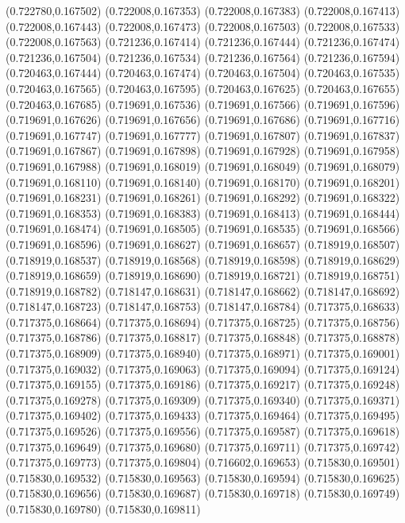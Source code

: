 (0.722780,0.167502)
(0.722008,0.167353)
(0.722008,0.167383)
(0.722008,0.167413)
(0.722008,0.167443)
(0.722008,0.167473)
(0.722008,0.167503)
(0.722008,0.167533)
(0.722008,0.167563)
(0.721236,0.167414)
(0.721236,0.167444)
(0.721236,0.167474)
(0.721236,0.167504)
(0.721236,0.167534)
(0.721236,0.167564)
(0.721236,0.167594)
(0.720463,0.167444)
(0.720463,0.167474)
(0.720463,0.167504)
(0.720463,0.167535)
(0.720463,0.167565)
(0.720463,0.167595)
(0.720463,0.167625)
(0.720463,0.167655)
(0.720463,0.167685)
(0.719691,0.167536)
(0.719691,0.167566)
(0.719691,0.167596)
(0.719691,0.167626)
(0.719691,0.167656)
(0.719691,0.167686)
(0.719691,0.167716)
(0.719691,0.167747)
(0.719691,0.167777)
(0.719691,0.167807)
(0.719691,0.167837)
(0.719691,0.167867)
(0.719691,0.167898)
(0.719691,0.167928)
(0.719691,0.167958)
(0.719691,0.167988)
(0.719691,0.168019)
(0.719691,0.168049)
(0.719691,0.168079)
(0.719691,0.168110)
(0.719691,0.168140)
(0.719691,0.168170)
(0.719691,0.168201)
(0.719691,0.168231)
(0.719691,0.168261)
(0.719691,0.168292)
(0.719691,0.168322)
(0.719691,0.168353)
(0.719691,0.168383)
(0.719691,0.168413)
(0.719691,0.168444)
(0.719691,0.168474)
(0.719691,0.168505)
(0.719691,0.168535)
(0.719691,0.168566)
(0.719691,0.168596)
(0.719691,0.168627)
(0.719691,0.168657)
(0.718919,0.168507)
(0.718919,0.168537)
(0.718919,0.168568)
(0.718919,0.168598)
(0.718919,0.168629)
(0.718919,0.168659)
(0.718919,0.168690)
(0.718919,0.168721)
(0.718919,0.168751)
(0.718919,0.168782)
(0.718147,0.168631)
(0.718147,0.168662)
(0.718147,0.168692)
(0.718147,0.168723)
(0.718147,0.168753)
(0.718147,0.168784)
(0.717375,0.168633)
(0.717375,0.168664)
(0.717375,0.168694)
(0.717375,0.168725)
(0.717375,0.168756)
(0.717375,0.168786)
(0.717375,0.168817)
(0.717375,0.168848)
(0.717375,0.168878)
(0.717375,0.168909)
(0.717375,0.168940)
(0.717375,0.168971)
(0.717375,0.169001)
(0.717375,0.169032)
(0.717375,0.169063)
(0.717375,0.169094)
(0.717375,0.169124)
(0.717375,0.169155)
(0.717375,0.169186)
(0.717375,0.169217)
(0.717375,0.169248)
(0.717375,0.169278)
(0.717375,0.169309)
(0.717375,0.169340)
(0.717375,0.169371)
(0.717375,0.169402)
(0.717375,0.169433)
(0.717375,0.169464)
(0.717375,0.169495)
(0.717375,0.169526)
(0.717375,0.169556)
(0.717375,0.169587)
(0.717375,0.169618)
(0.717375,0.169649)
(0.717375,0.169680)
(0.717375,0.169711)
(0.717375,0.169742)
(0.717375,0.169773)
(0.717375,0.169804)
(0.716602,0.169653)
(0.715830,0.169501)
(0.715830,0.169532)
(0.715830,0.169563)
(0.715830,0.169594)
(0.715830,0.169625)
(0.715830,0.169656)
(0.715830,0.169687)
(0.715830,0.169718)
(0.715830,0.169749)
(0.715830,0.169780)
(0.715830,0.169811)
